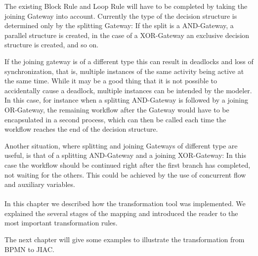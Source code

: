 The existing Block Rule and Loop Rule will have to be completed by taking the joining Gateway into account. Currently the type of the decision structure is determined only by the splitting Gateway: If the split is a AND-Gateway, a parallel structure is created, in the case of a XOR-Gateway an exclusive decision structure is created, and so on.

If the joining gateway is of a different type this can result in deadlocks and loss of synchronization, that is, multiple instances of the same activity being active at the same time. While it may be a good thing that it is not possible to accidentally cause a deadlock, multiple instances can be intended by the modeler. In this case, for instance when a splitting AND-Gateway is followed by a joining OR-Gateway, the remaining workflow after the Gateway would have to be encapsulated in a second process, which can then be called each time the workflow reaches the end of the decision structure.

Another situation, where splitting and joining Gateways of different type are useful, is that of a splitting AND-Gateway and a joining XOR-Gateway: In this case the workflow should be continued right after the first branch has completed, not waiting for the others. This could be achieved by the use of concurrent flow and auxiliary variables.
\\
\\

In this chapter we described how the transformation tool was implemented. We explained the several stages of the mapping and introduced the reader to the most important transformation rules.

The next chapter will give some examples to illustrate the transformation from BPMN to JIAC.